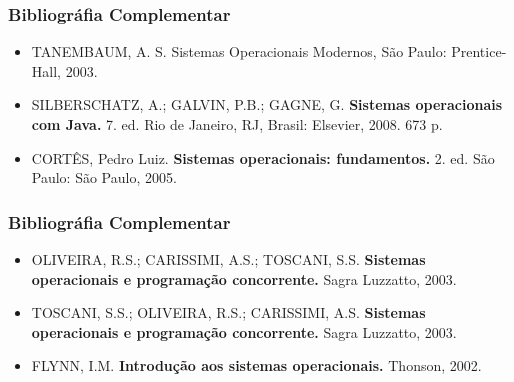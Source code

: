 \documentclass[aspectratio=169,
				xcolor=table]{beamer}
\begin{document}
	\begin{frame}
		\frametitle{Bibliográfia Complementar}
		\begin{itemize}
			\item TANEMBAUM, A. S. Sistemas Operacionais Modernos, São Paulo: Prentice-Hall, 2003.
			\vspace{1em}
			\item SILBERSCHATZ, A.; GALVIN, P.B.; GAGNE, G. \textbf{Sistemas operacionais com Java.} 7. ed. Rio de Janeiro, RJ, Brasil: Elsevier, 2008. 673 p.
			\item CORTÊS, Pedro Luiz. \textbf{Sistemas operacionais: fundamentos.} 2. ed. São Paulo: São Paulo, 2005.

		\end{itemize}
	\end{frame}

	\begin{frame}
		\frametitle{Bibliográfia Complementar}
		\begin{itemize}
		
			\item OLIVEIRA, R.S.; CARISSIMI, A.S.; TOSCANI, S.S. \textbf{Sistemas operacionais e programação concorrente.} Sagra Luzzatto, 2003.
			\vspace{1em}
			\item TOSCANI, S.S.; OLIVEIRA, R.S.; CARISSIMI, A.S. \textbf{Sistemas operacionais e programação concorrente.} Sagra Luzzatto, 2003.
			\vspace{1em}
			\item FLYNN, I.M. \textbf{Introdução aos sistemas operacionais.} Thonson, 2002.

		\end{itemize}
	\end{frame}
	
	\begin{frame}
	
	\end{frame}
\end{document}
